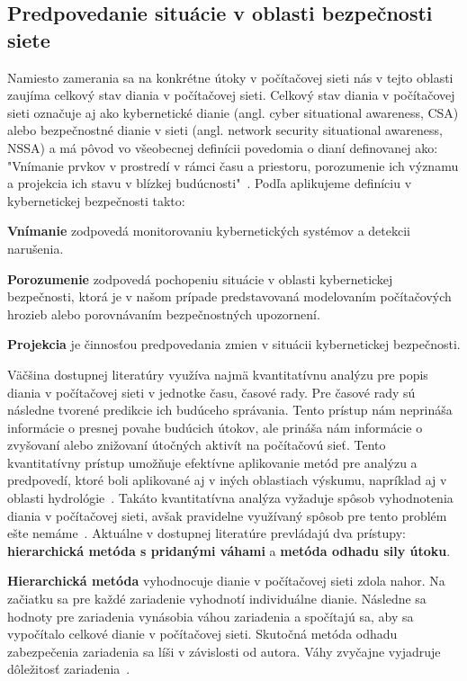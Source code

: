 \documentclass[thesismargins, thesislinespacing, openright, upjsfrontpage, combineabstracts]{rnthesis}
\begin{document}
\subsection{Predpovedanie situácie v oblasti bezpečnosti siete} \label{forecast}

Namiesto zamerania sa na konkrétne útoky v počítačovej sieti nás v tejto oblasti zaujíma celkový stav diania v počítačovej sieti. Celkový stav diania v počítačovej sieti označuje aj ako kybernetické dianie (angl. cyber situational awareness, CSA) alebo bezpečnostné dianie v sieti (angl. network security situational awareness, NSSA) a má pôvod vo všeobecnej definícii povedomia o dianí definovanej ako:
"Vnímanie prvkov v prostredí v rámci času a priestoru, porozumenie ich významu a projekcia ich stavu v blízkej budúcnosti"~\cite{Endsley1988}. Podľa \cite{Yang2014} aplikujeme definíciu v kybernetickej bezpečnosti takto: 

\begin{compactenum}
    \item \textbf{Vnímanie} zodpovedá monitorovaniu kybernetických systémov a detekcii narušenia.
    \item \textbf{Porozumenie} zodpovedá pochopeniu situácie v oblasti kybernetickej bezpečnosti, ktorá je v našom prípade predstavovaná modelovaním počítačových hrozieb alebo porovnávaním bezpečnostných upozornení. 
    \item \textbf{Projekcia} je činnosťou predpovedania zmien v situácii kybernetickej bezpečnosti. 
\end{compactenum}

Väčšina dostupnej literatúry využíva najmä kvantitatívnu analýzu pre popis diania v počítačovej sieti v jednotke času, časové rady. Pre časové rady sú následne tvorené predikcie ich budúceho správania. Tento prístup nám neprináša informácie o presnej povahe budúcich útokov, ale prináša nám informácie o zvyšovaní alebo znižovaní útočných aktivít na počítačovú sieť. Tento kvantitatívny prístup umožňuje efektívne aplikovanie metód pre analýzu a predpovedí, ktoré boli aplikované aj v iných oblastiach výskumu, napríklad aj v oblasti hydrológie~\cite{wang2009comparison}. Takáto kvantitatívna analýza vyžaduje spôsob vyhodnotenia diania v počítačovej sieti, avšak pravidelne využívaný spôsob pre tento problém ešte nemáme~\cite{husak2020preprint}. Aktuálne v dostupnej literatúre prevládajú dva prístupy: \textbf{hierarchická metóda s pridanými váhami} a \textbf{metóda odhadu sily útoku}. 

\textbf{Hierarchická metóda} vyhodnocuje dianie v počítačovej sieti zdola nahor. Na začiatku sa pre každé zariadenie vyhodnotí individuálne dianie. Následne sa hodnoty pre  zariadenia vynásobia váhou zariadenia a spočítajú sa, aby sa vypočítalo celkové dianie v počítačovej sieti. Skutočná metóda odhadu zabezpečenia zariadenia  sa líši v závislosti od autora. Váhy zvyčajne vyjadruje dôležitosť zariadenia~\cite{Husak2018survey}.
\end{document}
